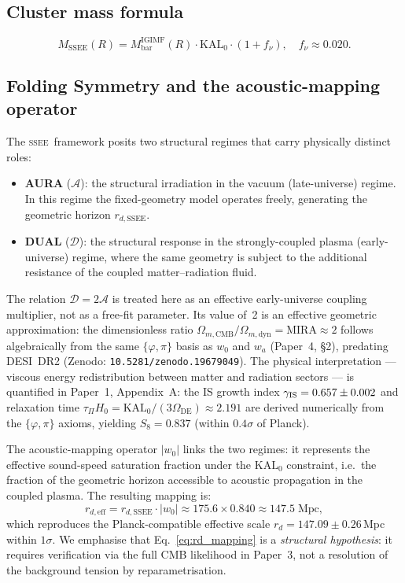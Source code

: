 \documentclass[12pt,a4paper]{article}
\newcommand{\SSEE}{\ifmmode\mathrm{SSEE}\else\textsc{ssee}\fi}
\newcommand{\KALz}{\mathrm{KAL}_0}
\newcommand{\wz}{w_0}
\newcommand{\Mssee}{M_{\mathrm{SSEE}}}
\newcommand{\Migimf}{M^{\mathrm{IGIMF}}_{\mathrm{bar}}}
\newcommand{\AURA}{\mathcal{A}}
\newcommand{\DUAL}{\mathcal{D}}
\newcommand{\rdSSEE}{r_{d,\mathrm{SSEE}}}
\newcommand{\rdeff}{r_{d,\mathrm{eff}}}
\begin{document}
\subsection{Cluster mass formula}

\begin{equation}
  \Mssee(R) = \Migimf(R)\cdot\KALz\cdot(1+f_\nu),\quad
  f_\nu\approx0.020.
  \label{eq:Mcluster}
\end{equation}

\subsection{Folding Symmetry and the acoustic-mapping operator}
\label{sec:folding}

The \SSEE\ framework posits two structural regimes that carry physically
distinct roles:
\begin{itemize}
  \item \textbf{AURA} ($\AURA$): the structural irradiation in the vacuum
    (late-universe) regime. In this regime the fixed-geometry model
    operates freely, generating the geometric horizon $\rdSSEE$.
  \item \textbf{DUAL} ($\DUAL$): the structural response in the
    strongly-coupled plasma (early-universe) regime, where the same
    geometry is subject to the additional resistance of the coupled
    matter–radiation fluid.
\end{itemize}
The relation $\DUAL = 2\AURA$ is treated here as an effective
early-universe coupling multiplier, not as a free-fit parameter.
Its value of~2 is an effective geometric approximation: the dimensionless ratio
$\Omega_{m,\mathrm{CMB}}/\Omega_{m,\mathrm{dyn}} = \mathrm{MIRA} \approx 2$
follows algebraically from the same $\{\varphi,\pi\}$ basis as $w_0$ and $w_a$
(Paper~4, \S2), predating DESI~DR2 (Zenodo: \texttt{10.5281/zenodo.19679049}).
The physical interpretation — viscous energy redistribution between matter and
radiation sectors — is quantified in Paper~1, Appendix~A: the IS growth
index $\gamma_{\rm IS}=0.657\pm0.002$ and relaxation time
$\tau_\Pi H_0 = \mathrm{KAL}_0/(3\Omega_{\mathrm{DE}})\approx 2.191$
are derived numerically from the $\{\varphi,\pi\}$ axioms, yielding
$S_8 = 0.837$ (within $0.4\sigma$ of Planck).

The acoustic-mapping operator $|\wz|$ links the two regimes: it
represents the effective sound-speed saturation fraction under the
$\KALz$ constraint, i.e.\ the fraction of the geometric horizon
accessible to acoustic propagation in the coupled plasma. The resulting
mapping is:
\begin{equation}
  \rdeff = \rdSSEE\cdot|\wz| \approx 175.6\times0.840 \approx 147.5\;\text{Mpc},
  \label{eq:rd_mapping}
\end{equation}
which reproduces the Planck-compatible effective scale
$r_d=147.09\pm0.26$\,Mpc within $1\sigma$. We emphasise that
Eq.~\eqref{eq:rd_mapping} is a \textit{structural hypothesis}: it
requires verification via the full CMB likelihood in Paper~3, not
a resolution of the background tension by reparametrisation.
\end{document}
